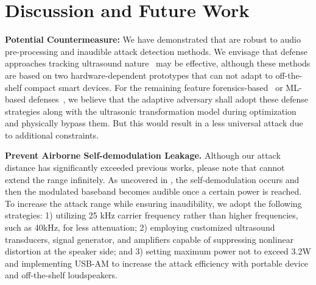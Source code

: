\vspace{-5pt}
\section{Discussion and Future Work}\label{sec:discuss}

\hspace{0.3em}\textbf{Potential Countermeasure:}
We have demonstrated that \alias are robust to audio pre-processing and inaudible attack detection methods. We envisage that defense approaches tracking ultrasound nature~\cite{zhang2021eararray,he2019canceling} may be effective, although these methods are based on two hardware-dependent prototypes that can not adapt to off-the-shelf compact smart devices. For the remaining feature forensics-based~\cite{zhang2017dolphinattack,roy2018inaudible} or ML-based defenses~\cite{li2021robust,li2023learning}, we believe that the adaptive adversary shall adopt these defense strategies along with the ultrasonic transformation model during optimization and physically bypass them. But this would result in a less universal attack due to additional constraints.

\textbf{Prevent Airborne Self-demodulation Leakage.}
Although our attack distance has significantly exceeded previous works, please note that \alias cannot extend the range infinitely. As uncovered in \cite{iijima2018audio}, the self-demodulation occurs and then the modulated baseband becomes audible once a certain power is reached. To increase the attack range while ensuring inaudibility, we adopt the following strategies: 1) utilizing 25 kHz carrier frequency rather than higher frequencies, such as 40kHz, for less attenuation; 2) employing customized ultrasound transducers, signal generator, and amplifiers capable of suppressing nonlinear distortion at the speaker side; and 3) setting maximum power not to exceed 3.2W and implementing USB-AM to increase the attack efficiency with portable device and off-the-shelf loudspeakers. %

